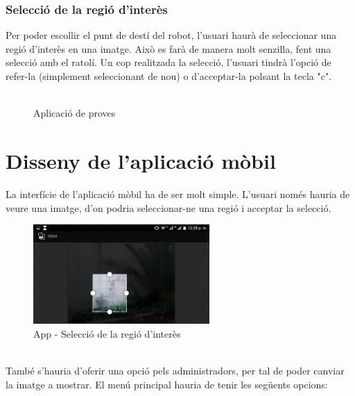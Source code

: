 	\subsubsection{Selecció de la regió d'interès}
		Per poder escollir el punt de destí del robot, l'usuari haurà de seleccionar una regió d'interès en una imatge. Això es farà de manera molt senzilla, fent una selecció amb el ratolí.
		Un cop realitzada la selecció, l'usuari tindrà l'opció de refer-la (simplement seleccionant de nou) o d'acceptar-la polsant la tecla "c".\\\\
		\begin{figure}[!htb]
			\caption{Aplicació de proves}
		\end{figure}
\newpage
\section{Disseny de l'aplicació mòbil}
	La interfície de l'aplicació mòbil ha de ser molt simple. L'usuari només hauria de veure una imatge, d'on podria seleccionar-ne una regió i acceptar la selecció.\\
	\begin{figure}[H]
			\centering
			\includegraphics[width=0.6\textwidth]{images/crop}
			\caption{App - Selecció de la regió d'interès}
		\end{figure}
	\noindent
	\\{}
	També s'hauria d'oferir una opció pels administradors, per tal de poder canviar la imatge a mostrar. El menú principal hauria de tenir les següents opcions:
